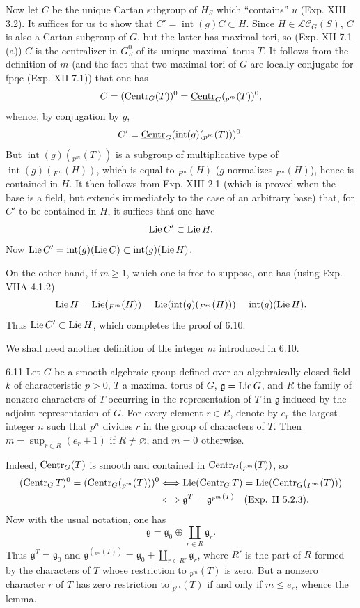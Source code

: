 Now let $C$ be the unique Cartan subgroup of $H_S$ which ``contains'' $u$ (Exp. XIII 3.2). It suffices for us to show that $C'=\operatorname{int}(g)C\subset H$. Since $H\in\mathscr{LC}_G(S)$, $C$ is also a Cartan subgroup of $G$, but the latter has maximal tori, so (Exp. XII 7.1 (a)) $C$ is the centralizer in $G_S^0$ of its unique maximal torus $T$. It follows from the definition of $m$ (and the fact that two maximal tori of $G$ are locally conjugate for fpqc (Exp. XII 7.1)) that one has
\[
C=(\operatorname{Centr}_G(T))^0=\underline{\mathrm{Centr}}_G({}_{p^m}(T))^0,
\]
whence, by conjugation by $g$,
\[
C'=\underline{\mathrm{Centr}}_G(\operatorname{int}(g)({}_{p^m}(T)))^0.
\]
But $\operatorname{int}(g)({}_{p^m}(T))$ is a subgroup of multiplicative type of $\operatorname{int}(g)({}_{F^m}(H))$, which is equal to ${}_{F^m}(H)$ ($g$ normalizes ${}_{F^m}(H)$), hence is contained in $H$. It then follows from Exp. XIII 2.1 (which is proved when the base is a field, but extends immediately to the case of an arbitrary base) that, for $C'$ to be contained in $H$, it suffices that one have
\[
\operatorname{Lie} C'\subset\operatorname{Lie} H.
\]
Now $\operatorname{Lie} C'=\operatorname{int}(g)(\operatorname{Lie} C)\subset\operatorname{int}(g)(\operatorname{Lie} H)$.

On the other hand, if $m\geq1$, which one is free to suppose, one has (using Exp. VIIA 4.1.2)
\[
\operatorname{Lie} H=\operatorname{Lie}({}_{F^m}(H))=\operatorname{Lie}(\operatorname{int}(g)({}_{F^m}(H)))=\operatorname{int}(g)(\operatorname{Lie} H).
\]
Thus $\operatorname{Lie} C'\subset\operatorname{Lie} H$, which completes the proof of 6.10.

We shall need another definition of the integer $m$ introduced in 6.10.
\begin{lemma}{6.11}\label{XV.6.11}
Let $G$ be a smooth algebraic group defined over an algebraically closed field $k$ of characteristic $p>0$, $T$ a maximal torus of $G$, $\mathfrak g=\operatorname{Lie} G$, and $R$ the family of nonzero characters of $T$ occurring in the representation of $T$ in $\mathfrak g$ induced by the adjoint representation of $G$. For every element $r\in R$, denote by $e_r$ the largest integer $n$ such that $p^n$ divides $r$ in the group of characters of $T$. Then $m=\sup_{r\in R}(e_r+1)$ if $R\ne\varnothing$, and $m=0$ otherwise.
\end{lemma}
Indeed, $\operatorname{Centr}_G(T)$ is smooth and contained in $\operatorname{Centr}_G({}_{p^m}(T))$, so
\[
\begin{aligned}
(\operatorname{Centr}_G T)^0=(\operatorname{Centr}_G({}_{p^m}(T)))^0
&\Longleftrightarrow \operatorname{Lie}(\operatorname{Centr}_G T)=\operatorname{Lie}(\operatorname{Centr}_G({}_{F^m}(T)))\\
&\Longleftrightarrow \mathfrak g^T=\mathfrak g^{{}_{p^m}(T)}\quad\text{(Exp. II 5.2.3)}.
\end{aligned}
\]
Now with the usual notation, one has
\[
\mathfrak g=\mathfrak g_0\oplus\coprod_{r\in R}\mathfrak g_r.
\]
Thus $\mathfrak g^T=\mathfrak g_0$ and $\mathfrak g^{({}_{p^m}(T))}=\mathfrak g_0+\coprod_{r\in R'}\mathfrak g_r$, where $R'$ is the part of $R$ formed by the characters of $T$ whose restriction to ${}_{p^m}(T)$ is zero. But a nonzero character $r$ of $T$ has zero restriction to ${}_{p^m}(T)$ if and only if $m\leq e_r$, whence the lemma.

